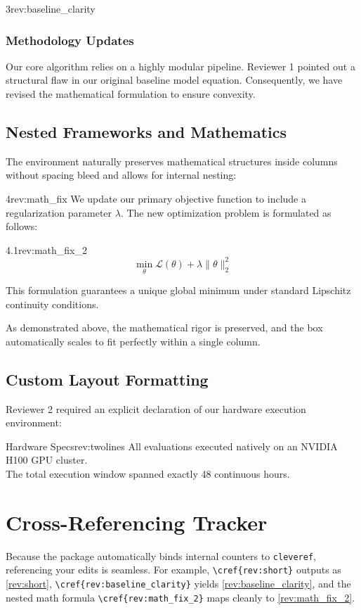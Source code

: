 \documentclass[10pt,journal,compsoc,twocolumn]{IEEEtran}
\begin{document}
\begin{imeant}[colframe=gren, colback=grenb]{3}{rev:baseline_clarity}
\subsubsection{Methodology Updates}
Our core algorithm relies on a highly modular pipeline. Reviewer 1 pointed out a structural flaw in our original baseline model equation. Consequently, we have revised the mathematical formulation to ensure convexity.
\end{imeant}

\subsection{Nested Frameworks and Mathematics}
The environment naturally preserves mathematical structures inside columns without spacing bleed and allows for internal nesting:

\begin{imeant}{4}{rev:math_fix}
    We update our primary objective function to include a regularization parameter $\lambda$. The new optimization problem is formulated as follows:
    
    \begin{imeant}{4.1}{rev:math_fix_2}
    \begin{equation}
        \min_{\theta} \mathcal{L}(\theta) + \lambda \|\theta\|_2^2
    \end{equation}
    \end{imeant}
    This formulation guarantees a unique global minimum under standard Lipschitz continuity conditions.
\end{imeant}

As demonstrated above, the mathematical rigor is preserved, and the box automatically scales to fit perfectly within a single column.

\subsection{Custom Layout Formatting}
Reviewer 2 required an explicit declaration of our hardware execution environment:
\begin{imeant}[colframe=ylow, colback=ylowb, top=4pt, bottom=4pt]{Hardware Specs}{rev:twolines}
    All evaluations executed natively on an NVIDIA H100 GPU cluster. \\
    The total execution window spanned exactly 48 continuous hours.
\end{imeant}

\section{Cross-Referencing Tracker}
Because the package automatically binds internal counters to \texttt{cleveref}, referencing your edits is seamless. For example, \verb|\cref{rev:short}| outputs as \cref{rev:short}, \verb|\cref{rev:baseline_clarity}| yields \cref{rev:baseline_clarity}, and the nested math formula \verb|\cref{rev:math_fix_2}| maps cleanly to \cref{rev:math_fix_2}.
\end{document}
